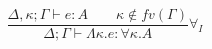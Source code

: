 \[
\frac { \Delta ,\kappa ;\Gamma \vdash e:A\quad \quad \kappa \notin fv(\Gamma)  }{ \Delta ;\Gamma \vdash \Lambda\kappa.e:\forall\kappa. A } { \forall }_{ I }
\]

